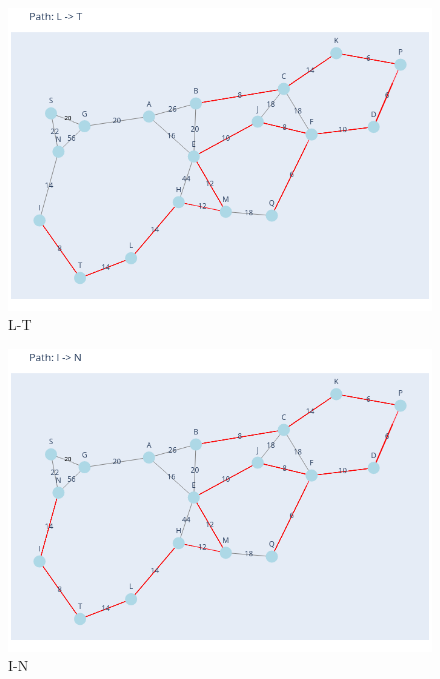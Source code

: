 \documentclass[11pt]{book}
\renewcommand{\=}[1]{\stackrel{#1}{=}} %
\theoremstyle{definition}
\theoremstyle{remark}
\begin{document}
\begin{figure}
    \centering
    \includegraphics[width=1\linewidth]{Trenches/13.png}
    \caption{L-T}
    \label{fig:enter-label}
\end{figure}
\begin{figure}
    \centering
    \includegraphics[width=1\linewidth]{Trenches/14.png}
    \caption{I-N}
    \label{fig:enter-label}
\end{figure}
\end{document}
